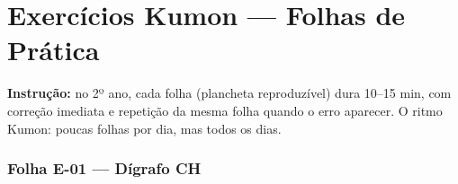 
\chapter{Exercícios Kumon --- Folhas de Prática}

\textbf{Instrução:} no 2º ano, cada folha (plancheta reproduzível) dura 10–15 min, com correção imediata e repetição da mesma folha quando o erro aparecer. O ritmo Kumon: poucas folhas por dia, mas todos os dias.



\subsection{Folha E-01 --- Dígrafo CH}
